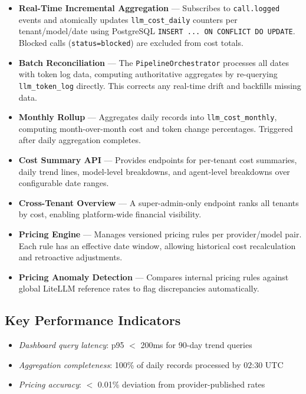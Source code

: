 \documentclass[12pt,a4paper,twoside]{report}
\newcommand{\kpi}[1]{\textit{\textcolor{accentgreen}{#1}}}
\begin{document}
\begin{itemize}
  \item \textbf{Real-Time Incremental Aggregation} — Subscribes to \texttt{call.logged} events and atomically updates \texttt{llm\_cost\_daily} counters per tenant/model/date using PostgreSQL \texttt{INSERT ... ON CONFLICT DO UPDATE}. Blocked calls (\texttt{status=blocked}) are excluded from cost totals.

  \item \textbf{Batch Reconciliation} — The \texttt{PipelineOrchestrator} processes all dates with token log data, computing authoritative aggregates by re-querying \texttt{llm\_token\_log} directly. This corrects any real-time drift and backfills missing data.

  \item \textbf{Monthly Rollup} — Aggregates daily records into \texttt{llm\_cost\_monthly}, computing month-over-month cost and token change percentages. Triggered after daily aggregation completes.

  \item \textbf{Cost Summary API} — Provides endpoints for per-tenant cost summaries, daily trend lines, model-level breakdowns, and agent-level breakdowns over configurable date ranges.

  \item \textbf{Cross-Tenant Overview} — A super-admin-only endpoint ranks all tenants by cost, enabling platform-wide financial visibility.

  \item \textbf{Pricing Engine} — Manages versioned pricing rules per provider/model pair. Each rule has an effective date window, allowing historical cost recalculation and retroactive adjustments.

  \item \textbf{Pricing Anomaly Detection} — Compares internal pricing rules against global LiteLLM reference rates to flag discrepancies automatically.
\end{itemize}

\subsection{Key Performance Indicators}
\begin{itemize}
  \item \kpi{Dashboard query latency}: p95 $<$ 200ms for 90-day trend queries
  \item \kpi{Aggregation completeness}: 100\% of daily records processed by 02:30 UTC
  \item \kpi{Pricing accuracy}: $<$ 0.01\% deviation from provider-published rates
\end{itemize}
\end{document}
